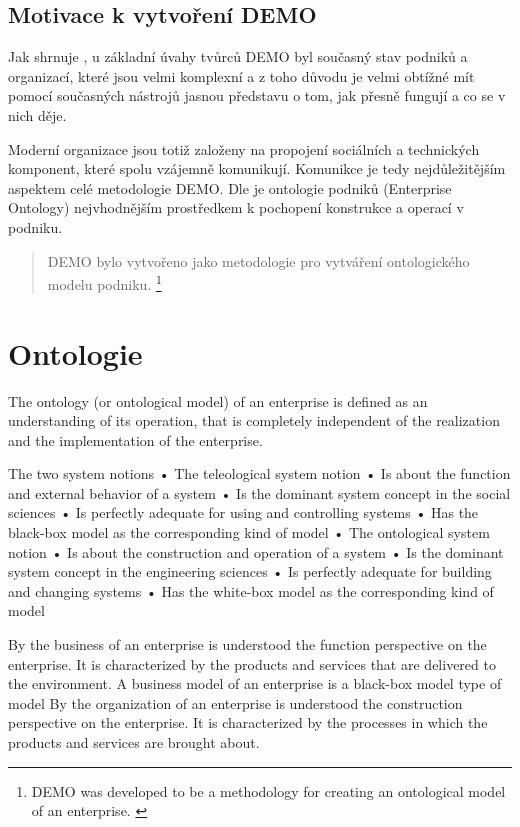 \documentclass[]{article}
\begin{document}
\subsection{Motivace k vytvoření DEMO}
Jak shrnuje \cite{Vejrazkova2013}, u základní úvahy tvůrců DEMO byl současný stav podniků a organizací, které jsou velmi komplexní a z toho důvodu je velmi obtížné mít pomocí současných nástrojů jasnou představu o tom, jak přesně fungují a co se v nich děje.

Moderní organizace jsou totiž založeny na propojení sociálních a technických komponent, které spolu vzájemně komunikují. Komunikce je tedy nejdůležitějším aspektem celé metodologie DEMO. Dle \cite{Dietz2006} je ontologie podniků (Enterprise Ontology) nejvhodnějším prostředkem k pochopení konstrukce a operací v podniku.

\begin{quote}
DEMO bylo vytvořeno jako metodologie pro vytváření ontologického modelu podniku. \cite{Vejrazkova2012}
\footnote{DEMO was developed to be a methodology for creating an ontological model of an enterprise. \cite{Vejrazkova2012}}
\end{quote}

\section{Ontologie}

The ontology (or ontological model) of an enterprise is defined as an understanding of its operation, that is completely independent of the realization and the implementation of the enterprise.

   The two system notions
• The teleological system notion
• Is about the function and external behavior of a system
• Is the dominant system concept in the social sciences
• Is perfectly adequate for using and controlling systems
• Has the black-box model as the corresponding kind of model
• The ontological system notion
• Is about the construction and operation of a system
• Is the dominant system concept in the engineering sciences
• Is perfectly adequate for building and changing systems
• Has the white-box model as the corresponding kind of model

By the business of an enterprise is understood the function perspective on the enterprise. It is characterized by the products and services that are delivered to the environment.
A business model of an enterprise is a black-box model type of model
By the organization of an enterprise is understood the construction perspective on the enterprise. It is characterized by the processes in which the products and services are brought about.
\end{document}
